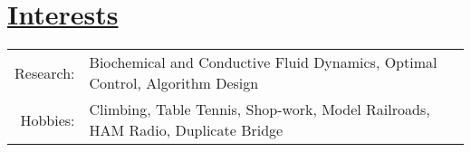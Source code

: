 \section*{\underline{Interests}}
\begin{tabular}{r | l}
Research:   &Biochemical and Conductive Fluid Dynamics, Optimal Control, Algorithm Design\\
Hobbies:    &Climbing, Table Tennis, Shop-work, Model Railroads, HAM Radio, Duplicate Bridge
\end{tabular}
